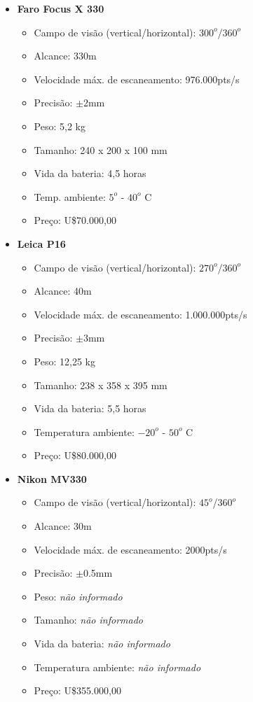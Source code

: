\begin{itemize}
  \item \textbf{Faro Focus X 330}
  	\begin{itemize}
  		\item Campo de visão (vertical/horizontal): $300^o$/$360^o$
  		\item Alcance: 330m
  		\item Velocidade máx. de escaneamento: 976.000pts/s
  		\item Precisão: $\pm$2mm
  		\item Peso: 5,2 kg
  		\item Tamanho: 240 x 200 x 100 mm
  		\item Vida da bateria: 4,5 horas
  		\item Temp. ambiente: $5^o$ - $40^o$ C
  		\item Preço: U\$70.000,00
	\end{itemize}
  \item \textbf{Leica P16}
  	\begin{itemize}
  		\item Campo de visão (vertical/horizontal): $270^o$/$360^o$
  		\item Alcance: 40m
  		\item Velocidade máx. de escaneamento: 1.000.000pts/s
  		\item Precisão: $\pm$3mm
  		\item Peso: 12,25 kg
  		\item Tamanho: 238 x 358 x 395 mm
  		\item Vida da bateria: 5,5 horas
  		\item Temperatura ambiente: $-20^o$ - $50^o$ C
  		\item Preço: U\$80.000,00
	\end{itemize}
   \item \textbf{Nikon MV330}
  	\begin{itemize}
  		\item Campo de visão (vertical/horizontal): $45^o$/$360^o$
  		\item Alcance: 30m
  		\item Velocidade máx. de escaneamento: 2000pts/s
  		\item Precisão: $\pm$0.5mm
  		\item Peso: \textit{não informado}
  		\item Tamanho: \textit{não informado}
  		\item Vida da bateria: \textit{não informado}
  		\item Temperatura ambiente: \textit{não informado}
  		\item Preço: U\$355.000,00
	\end{itemize}


\end{itemize}


